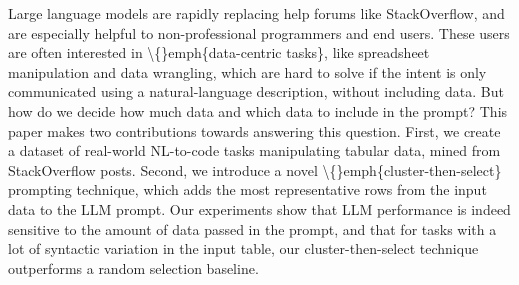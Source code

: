 Large language models are rapidly replacing help forums like StackOverflow, and are especially helpful to non-professional programmers and end users. These users are often interested in \textbackslash\{\}emph\{data-centric tasks\}, like spreadsheet manipulation and data wrangling, which are hard to solve if the intent is only communicated using a natural-language description, without including data. But how do we decide how much data and which data to include in the prompt? This paper makes two contributions towards answering this question.  First, we create a dataset of real-world NL-to-code tasks manipulating tabular data, mined from StackOverflow posts. Second, we introduce a novel \textbackslash\{\}emph\{cluster-then-select\} prompting technique, which adds the most representative rows from the input data to the LLM prompt. Our experiments show that LLM performance is indeed sensitive to the amount of data passed in the prompt, and that for tasks with a lot of syntactic variation in the input table, our cluster-then-select technique outperforms a random selection baseline.